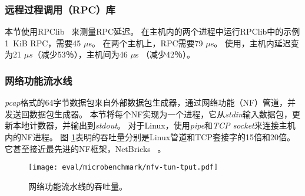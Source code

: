 




\subsubsection{远程过程调用（RPC）库}

本节使用RPClib~ \cite {rpclib}来测量RPC延迟。
在主机内的两个进程中运行RPClib中的示例1~KiB RPC，需要45 $ \mu $s。 在两个主机上，RPC需要79 $ \mu$s。
使用\sys {}，主机内延迟变为21 $ \mu s $（减少53％），主机间为46 $ \mu$s （减少42％）。

\subsubsection{网络功能流水线}

\emph {pcap}格式的64字节数据包来自外部数据包生成器，通过网络功能（NF）管道，并发送回数据包生成器。
本节将每个NF实现为一个进程，它从\emph {stdin}输入数据包，更新本地计数器，并输出到\emph {stdout}。
对于Linux，使用\emph {pipe}和\emph {TCP socket}来连接主机内的NF进程。
图 \ref {socksdirect:fig:eval-tun-tput}表明\sys {}的吞吐量分别是Linux管道和TCP套接字的15倍和20倍。
它甚至接近最先进的NF框架，NetBricks~ \cite {panda2016netbricks}。

\begin{figure}[htbp]
	\centering
	\texttt{[image: eval/microbenchmark/nfv-tun-tput.pdf]}
	
	\caption{网络功能流水线的吞吐量。}
	\label{socksdirect:fig:eval-tun-tput}
	
	
\end{figure}




